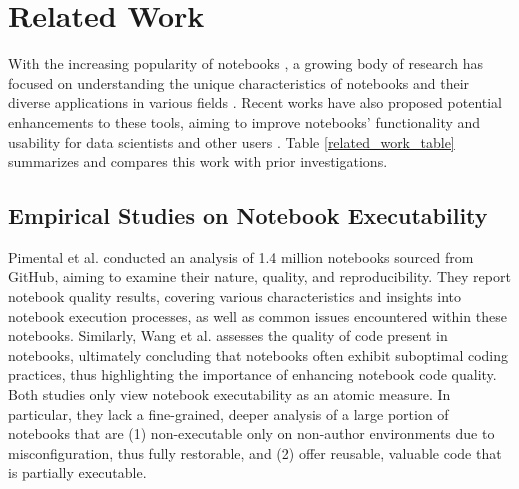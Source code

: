 \vspace{-0.5ex}
\section{Related Work}
\label{related work}

    With the increasing popularity of notebooks \cite{Kluyver2016}, a growing body of research has focused on understanding the unique characteristics of notebooks \cite{Chattopadhyay2020, Rule2018, Rule2018CellFolding, In2024, gigascience2024} and their diverse applications in various fields \cite{Wang2019, Randles2017, Li2021}. Recent works have also proposed potential enhancements to these tools, aiming to improve notebooks' functionality and usability for data scientists and other users \cite{Chattopadhyay2020, Wang2024, McNutt2023, gigascience2024}. Table \ref{related_work_table} summarizes and compares this work with prior investigations. %

    \subsection{Empirical Studies on Notebook Executability}
        Pimental et al. \cite{Pimentel2019, Pimentel2021} conducted an analysis of 1.4 million notebooks sourced from GitHub, aiming to examine their nature, quality, and reproducibility. They report notebook quality results, covering various characteristics and insights into notebook execution processes, as well as common issues encountered within these notebooks. Similarly, Wang et al. \cite{Wang2019BetterCode} assesses the quality of code present in notebooks, ultimately concluding that notebooks often exhibit suboptimal coding practices, thus highlighting the importance of enhancing notebook code quality. Both studies only view notebook executability as an atomic measure. In particular, they lack a fine-grained, deeper analysis of a large portion of notebooks that are (1) non-executable only on non-author environments due to misconfiguration, thus fully restorable, and (2) offer reusable, valuable code that is partially executable. 

    

